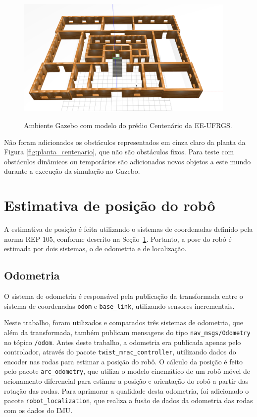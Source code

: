 \documentclass[repeatfields,xlists,xpacks,oneside,yearsonly]{ufrgscca}
\begin{document}
\begin{figure}[h]
    {
        \centering
        \caption{Ambiente Gazebo com modelo do prédio Centenário da EE-UFRGS.}
        \label{fig:gazebo_centenario}
        \includegraphics[width=0.95\textwidth]{gazebo.png}\\
    }
\end{figure}

Não foram adicionados os obstáculos representados em cinza claro da
planta da Figura \ref{fig:planta_centenario}, que não são obstáculos
fixos. Para teste com obstáculos dinâmicos ou temporários são
adicionados novos objetos a este mundo durante a execução da
simulação no Gazebo.

\section{Estimativa de posição do robô}
\label{bib:estimativa_posicao}

A estimativa de posição é feita utilizando o sistemas de coordenadas
definido pela norma REP 105, conforme descrito na
Seção~\ref{bib:estimativa_posicao}. Portanto, a pose do robô é
estimada por dois sistemas, o de odometria e de localização.

\subsection{Odometria}
\label{met:odometria}

O sistema de odometria é responsável pela publicação da transformada
entre o sistema de coordenadas \texttt{odom} e \texttt{base\_link},
utilizando sensores incrementais.

Neste trabalho, foram utilizados e comparados três sistemas de
odometria, que além da transformada, também publicam mensagens do
tipo \texttt{nav\_msgs/Odometry} no tópico \texttt{/odom}. Antes
deste trabalho, a odometria era publicada apenas pelo controlador,
através do pacote \texttt{twist\_mrac\_controller}, utilizando dados
do encoder nas rodas para estimar a posição do robô. O cálculo da
posição é feito pelo pacote \texttt{arc\_odometry}, que utiliza o
modelo cinemático de um robô móvel de acionamento diferencial para
estimar a posição e orientação do robô a partir das rotação das
rodas. Para aprimorar a qualidade desta odometria, foi adicionado o
pacote \texttt{robot\_localization}, que realiza a fusão de dados da
odometria das rodas com os dados do IMU.
\end{document}
